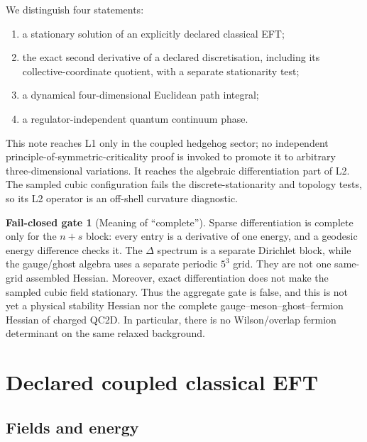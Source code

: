 \documentclass[11pt]{article}
\theoremstyle{definition}
\newtheorem{gate}[proposition]{Fail-closed gate}
\theoremstyle{remark}
\begin{document}
We distinguish four statements:
\begin{enumerate}[label=(L\arabic*)]
\item a stationary solution of an explicitly declared classical EFT;
\item the exact second derivative of a declared discretisation, including
  its collective-coordinate quotient, with a separate stationarity test;
\item a dynamical four-dimensional Euclidean path integral;
\item a regulator-independent quantum continuum phase.
\end{enumerate}
This note reaches L1 only in the coupled hedgehog sector; no independent
principle-of-symmetric-criticality proof is invoked to promote it to arbitrary
three-dimensional variations.  It reaches the algebraic differentiation part
of L2.  The sampled cubic configuration fails the discrete-stationarity and
topology tests, so its L2 operator is an off-shell curvature diagnostic.

\begin{gate}[Meaning of ``complete'']
Sparse differentiation is complete only for the \(n+s\) block:
every entry is a derivative of one energy, and a geodesic energy difference
checks it.  The \(\Delta\) spectrum is a separate Dirichlet block, while the
gauge/ghost algebra uses a separate periodic \(5^3\) grid.  They are not one
same-grid assembled Hessian.  Moreover, exact differentiation does not make
the sampled cubic field stationary.  Thus the aggregate
 gate is false,
and this is not yet a physical stability Hessian nor the complete
gauge--meson--ghost--fermion Hessian of charged QC2D.  In particular, there is
no Wilson/overlap fermion determinant on the same relaxed background.
\end{gate}

\section{Declared coupled classical EFT}

\subsection{Fields and energy}
\end{document}

